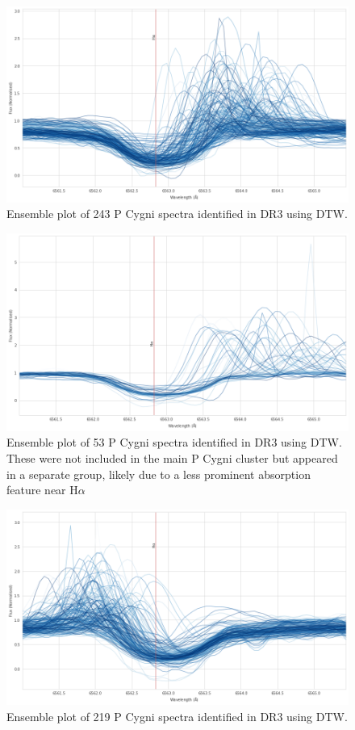 \begin{figure}[!htb]
\centering
\includegraphics[scale=0.45]{figures/p cygni ensemble.png}
\caption{Ensemble plot of 243 P Cygni spectra identified in DR3 using DTW.}
\end{figure}

\begin{figure}[!htb]
\centering
\includegraphics[scale=0.45]{figures/p cugni 2.png}
\caption{Ensemble plot of 53 P Cygni spectra identified in DR3 using DTW. These were not included in the main P Cygni cluster but appeared in a separate group, likely due to a less prominent absorption feature near H$\alpha$}
\end{figure}

\begin{figure}[!htb]
\centering
\includegraphics[scale=0.45]{figures/inverse p cygni ensemble.png}
\caption{Ensemble plot of 219 P Cygni spectra identified in DR3 using DTW.}
\end{figure}

